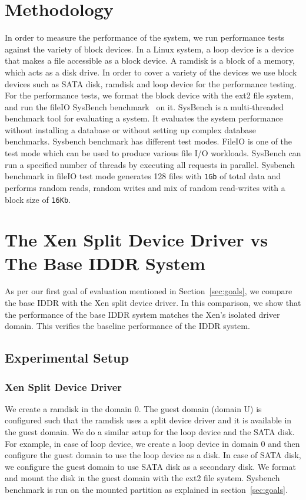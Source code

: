 \section{Methodology}
In order to measure the performance of the system, we run performance tests against the variety of block devices. In a Linux system, a loop device is a device that makes a file accessible as a block device. A ramdisk is a block of a memory, which acts as a disk drive. In order to cover a variety of the devices we use block devices such as SATA disk, ramdisk and loop device for the performance testing.
\\[3mm]
For the performance tests, we format the block device with the ext2 file system, and run the fileIO SysBench benchmark~\cite{sysbench} on it. SysBench is a multi-threaded benchmark tool for evaluating a system. It evaluates the system performance without installing a database or without setting up complex database benchmarks. Sysbench benchmark has different test modes. FileIO is one of the test mode which can be used to produce various file I/O workloads. SysBench can run a specified number of threads by executing all requests in parallel. Sysbench benchmark in fileIO test mode generates 128 files with \texttt{1Gb} of total data and performs random reads, random writes and mix of random read-writes with a block size of \texttt{16Kb}. 

\section{The Xen Split Device Driver vs The Base IDDR System}
As per our first goal of evaluation mentioned in Section~\ref{sec:goals}, we compare the base IDDR with the Xen split device driver. In this comparison, we show that the performance of the base IDDR system matches the Xen's isolated driver domain. This verifies the baseline performance of the IDDR system.

\subsection*{Experimental Setup}

\subsubsection*{Xen Split Device Driver}
We create a ramdisk in the domain 0. The guest domain (domain U) is configured such that the ramdisk uses a split device driver and it is available in the guest domain. We do a similar setup for the loop device and the SATA disk. For example, in case of loop device, we create a loop device in domain 0 and then configure the guest domain to use the loop device as a disk. In case of SATA disk, we configure the guest domain to use SATA disk as a secondary disk. We format and mount the disk in the guest domain with the ext2 file system. Sysbench benchmark is run on the mounted partition as explained in section~\ref{sec:goals}.


